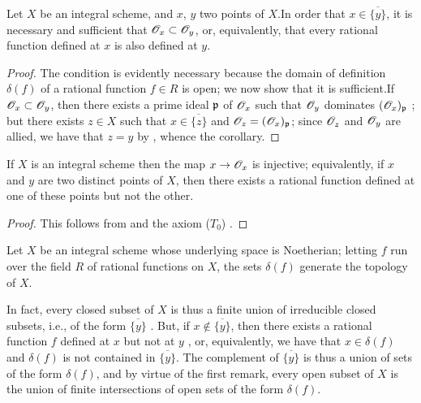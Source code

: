 \begin{cor}[8.2.3]
\label{1.8.2.3}
Let $X$ be an integral scheme, and $x$, $y$ two
points of $X$.In order that $x\in\overline{\{y\}}$, it is necessary and
sufficient that $\mathscr{O}_x\subset\mathscr{O}_y$, or, equivalently, that every rational
function defined at $x$ is also defined at $y$.
\end{cor}

\begin{proof}
\label{proof-1.8.2.3}
The condition is evidently necessary because the domain of definition
$\delta(f)$ of a rational function $f\in R$ is open; we now show that it is
sufficient.If $\mathscr{O}_x\subset\mathscr{O}_y$, then there exists a prime ideal
$\mathfrak{p}$ of $\mathscr{O}_x$ such that $\mathscr{O}_y$ dominates $(\mathscr{O}_x)_\mathfrak{p}$
; but  there exists $z\in X$ such that
$x\in\overline{\{z\}}$ and $\mathscr{O}_z=(\mathscr{O}_x)_\mathfrak{p}$; since $\mathscr{O}_z$ and $\mathscr{O}_y$
are allied, we have that $z=y$ by , whence the corollary.
\end{proof}

\begin{cor}[8.2.4]
\label{1.8.2.4}
If $X$ is an integral scheme then the map
$x\to\mathscr{O}_x$ is injective; equivalently, if $x$ and $y$ are two distinct points of
$X$, then there exists a rational function defined at one of these points but
not the other.
\end{cor}

\begin{proof}
\label{proof-1.8.2.4}
This follows from  and the axiom ($T_0$) .
\end{proof}

\begin{cor}[8.2.5]
\label{1.8.2.5}
Let $X$ be an integral scheme whose underlying
space is Noetherian; letting $f$ run over the field $R$ of rational functions on
$X$, the sets $\delta(f)$ generate the topology of $X$.
\end{cor}

In fact, every closed subset of $X$ is thus a finite union of irreducible closed
subsets, i.e., of the form $\overline{\{y\}}$ . But, if
$x\not\in\overline{\{y\}}$, then there exists a rational function $f$ defined at
$x$ but not at $y$ , or, equivalently, we have that $x\in\delta(f)$
and $\delta(f)$ is not contained in $\overline{\{y\}}$. The complement of
$\overline{\{y\}}$ is thus a union of sets of the form $\delta(f)$, and by
virtue of the first remark, every open subset of $X$ is the union of finite
intersections of open sets of the form $\delta(f)$.

